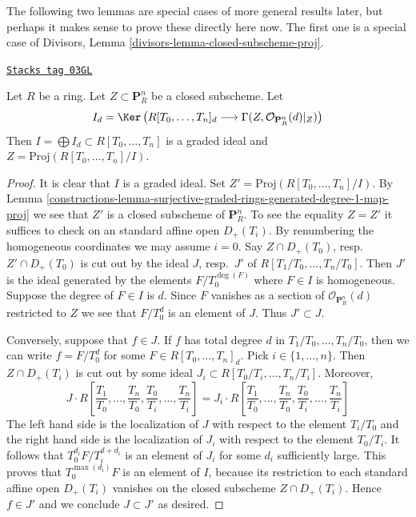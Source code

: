 The following two lemmas are special cases of more general results later, but
perhaps it makes sense to prove these directly here now. The first one is
a special case of Divisors, Lemma \ref{divisors-lemma-closed-subscheme-proj}.

\begin{lemma}
\label{constructions-lemma-closed-in-projective-space}
\href{https://stacks.math.columbia.edu/tag/03GL}{\texttt{Stacks tag 03GL}}

Let $R$ be a ring. Let $Z \subset \mathbf{P}^n_R$ be a closed subscheme.
Let
$$
I_d = \Ker\left(
R[T_0, \ldots, T_n]_d
\longrightarrow
\Gamma(Z, \mathcal{O}_{\mathbf{P}^n_R}(d)|_Z)\right)
$$
Then $I = \bigoplus I_d \subset R[T_0, \ldots, T_n]$ is
a graded ideal and $Z = \text{Proj}(R[T_0, \ldots, T_n]/I)$.
\end{lemma}

\begin{proof}

It is clear that $I$ is a graded ideal.
Set $Z' = \text{Proj}(R[T_0, \ldots, T_n]/I)$.
By Lemma \ref{constructions-lemma-surjective-graded-rings-generated-degree-1-map-proj}
we see that $Z'$ is a closed subscheme of $\mathbf{P}^n_R$.
To see the equality $Z = Z'$
it suffices to check on an standard affine open
$D_{+}(T_i)$. By renumbering the homogeneous coordinates we
may assume $i = 0$. Say $Z \cap D_{+}(T_0)$, resp.\ $Z' \cap D_{+}(T_0)$
is cut out by the ideal $J$, resp.\ $J'$ of $R[T_1/T_0, \ldots, T_n/T_0]$.
Then $J'$ is the ideal generated by the elements $F/T_0^{\deg(F)}$ where
$F \in I$ is homogeneous.
Suppose the degree of $F \in I$ is $d$. Since $F$ vanishes as a section
of $\mathcal{O}_{\mathbf{P}^n_R}(d)$ restricted to $Z$ we see that
$F/T_0^d$ is an element of $J$. Thus $J' \subset J$.

\medskip\noindent
Conversely, suppose that $f \in J$. If $f$ has total degree
$d$ in $T_1/T_0, \ldots, T_n/T_0$, then we can write
$f = F/T_0^d$ for some $F \in R[T_0, \ldots, T_n]_d$.
Pick $i \in \{1, \ldots, n\}$. Then $Z \cap D_{+}(T_i)$ is
cut out by some ideal $J_i \subset R[T_0/T_i, \ldots, T_n/T_i]$.
Moreover,
$$
J \cdot
R\left[
\frac{T_1}{T_0}, \ldots, \frac{T_n}{T_0},
\frac{T_0}{T_i}, \ldots, \frac{T_n}{T_i}
\right]
=
J_i \cdot
R\left[
\frac{T_1}{T_0}, \ldots, \frac{T_n}{T_0},
\frac{T_0}{T_i}, \ldots, \frac{T_n}{T_i}
\right]
$$
The left hand side is the localization of $J$ with respect to the
element $T_i/T_0$ and the right hand side is the localization of $J_i$
with respect to the element $T_0/T_i$. It follows that
$T_0^{d_i}F/T_i^{d + d_i}$ is an element of $J_i$ for some $d_i$
sufficiently large. This proves that $T_0^{\max(d_i)}F$ is an
element of $I$, because its restriction to each standard affine
open $D_{+}(T_i)$ vanishes on the closed subscheme
$Z \cap D_{+}(T_i)$. Hence $f \in J'$ and we conclude $J \subset J'$
as desired.
\end{proof}


